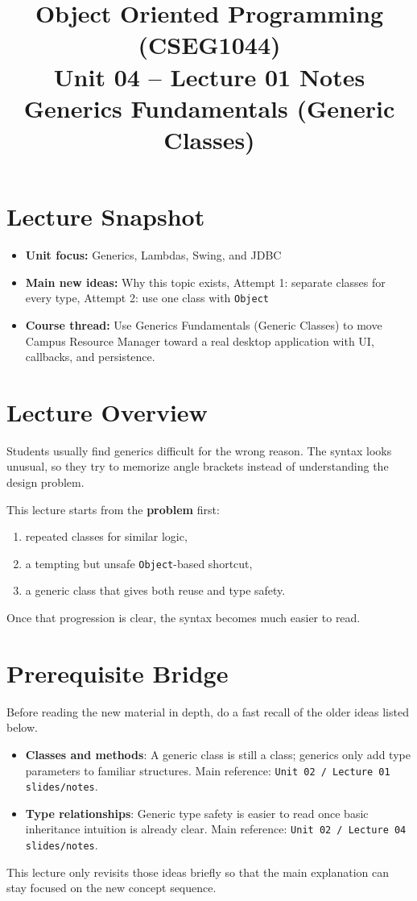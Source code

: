 \documentclass[11pt]{article}
\title{Object Oriented Programming (CSEG1044)\\Unit 04 -- Lecture 01 Notes\\Generics Fundamentals (Generic Classes)}
\begin{document}
\maketitle
\tableofcontents

\section{Lecture Snapshot}
\begin{itemize}
  \item \textbf{Unit focus:} Generics, Lambdas, Swing, and JDBC
  \item \textbf{Main new ideas:} Why this topic exists, Attempt 1: separate classes for every type, Attempt 2: use one class with \texttt{Object}
  \item \textbf{Course thread:} Use Generics Fundamentals (Generic Classes) to move Campus Resource Manager toward a real desktop application with UI, callbacks, and persistence.
\end{itemize}
\notesources{\OOPSUnitIVSources}

\section{Lecture Overview}
Students usually find generics difficult for the wrong reason.
The syntax looks unusual, so they try to memorize angle brackets instead of understanding the design problem.

This lecture starts from the \textbf{problem} first:
\begin{enumerate}
  \item repeated classes for similar logic,
  \item a tempting but unsafe \texttt{Object}-based shortcut,
  \item a generic class that gives both reuse and type safety.
\end{enumerate}

Once that progression is clear, the syntax becomes much easier to read.
\notesources{\OOPSUnitIVSources}

\section{Prerequisite Bridge}
Before reading the new material in depth, do a fast recall of the older ideas listed below.
\begin{itemize}
  \item \textbf{Classes and methods}: A generic class is still a class; generics only add type parameters to familiar structures. Main reference: \texttt{Unit 02 / Lecture 01 slides/notes}.
  \item \textbf{Type relationships}: Generic type safety is easier to read once basic inheritance intuition is already clear. Main reference: \texttt{Unit 02 / Lecture 04 slides/notes}.
\end{itemize}
This lecture only revisits those ideas briefly so that the main explanation can stay focused on the new concept sequence.
\notesources{\OOPSUnitIVSources}
\end{document}
